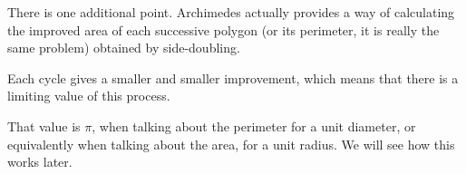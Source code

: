 \documentclass[11pt, oneside]{article}
\begin{document}
There is one additional point.  Archimedes actually provides a way of calculating the improved area of each successive polygon (or its perimeter, it is really the same problem) obtained by side-doubling.

Each cycle gives a smaller and smaller improvement, which means that there is a limiting value of this process.

That value is $\pi$, when talking about the perimeter for a unit diameter, or equivalently  when talking about the area, for a unit radius.  We will see how this works later.
\end{document}
